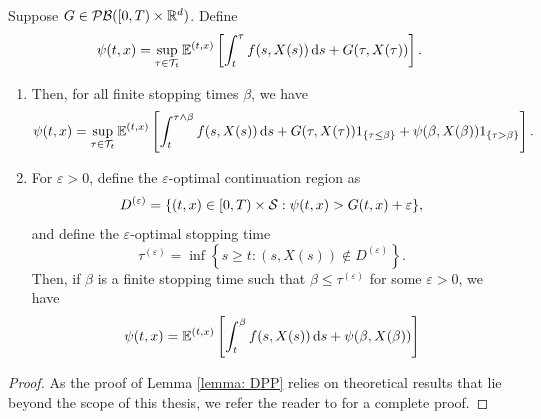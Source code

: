 \begin{lemma}
\label{lemma: DPP}
    Suppose $G \in \mathcal{PB}([0,T)\times \mathbb{R}^d)$. Define 
    \begin{equation}
        \psi(t,x) = \sup_{\tau \in \mathcal{T}_t}\mathbb{E}^{(t,x)}\left[ \int_t^\tau f(s,X(s)) \,\mathrm{d} s + G(\tau, X(\tau)) \right].
        \label{eqn: (10.1.15) in ØS}
    \end{equation}
    \begin{enumerate}[label=(\alph*)]
        \item Then, for all finite stopping times $\beta$, we have
        \begin{equation}
            \psi(t,x) = \sup_{\tau \in \mathcal{T}_t} \mathbb{E}^{(t,x)}\left[ \int_t^{\tau \wedge\beta} f(s,X(s)) \,\mathrm{d} s + G(\tau, X(\tau))1_{\left\{\tau \leq \beta\right\}} + \psi(\beta,X(\beta))1_{\left\{\tau > \beta\right\}} \right].
            \label{eqn: (10.1.16) in ØS}
        \end{equation}
        \item For $\varepsilon>0$, define the $\varepsilon$-optimal continuation region as
        \begin{equation*}
            D^{(\varepsilon)} = \{(t,x) \in [0,T)\times \mathcal{S}: \psi(t,x) > G(t,x) + \varepsilon\},
        \end{equation*}
        and define the $\varepsilon$-optimal stopping time 
        \begin{equation*}
            \tau^{(\varepsilon)} = \inf\left\{s \geq t: (s,X(s)) \notin D^{(\varepsilon)}\right\}.
        \end{equation*}
        Then, if $\beta$ is a finite stopping time such that $\beta \leq \tau^{(\varepsilon)}$ for some $\varepsilon > 0$, we have
        \begin{equation}
            \psi(t,x) = \mathbb{E}^{(t,x)} \left[ \int_t^{\beta} f(s,X(s)) \,\mathrm{d} s + \psi(\beta, X(\beta)) \right]
        \end{equation}
    \end{enumerate}
\end{lemma}
\begin{proof}
    As the proof of Lemma \ref{lemma: DPP} relies on theoretical results that lie beyond the scope of this thesis, we refer the reader to \cite[Section 4]{ishikawa2004optimal} for a complete proof.
\end{proof}

